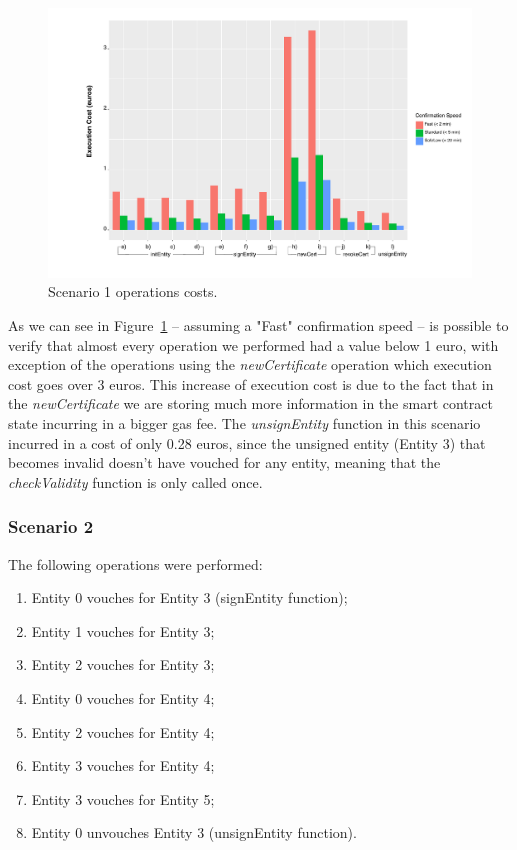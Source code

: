 \begin{figure}[htb]
  \centering
  \includegraphics[scale=0.5]{Figures/evaluation/wot-scenario1.pdf}
  \caption{Scenario 1 operations costs.}
\label{fig:scenario1-operation-cost}
\end{figure}

As we can see in Figure~\ref{fig:scenario1-operation-cost} – assuming a "Fast" confirmation speed – is possible to verify that almost every operation we performed had a value below 1 euro, with exception of the operations using the \textit{newCertificate} operation which execution cost goes over 3 euros.
This increase of execution cost is due to the fact that in the \textit{newCertificate} we are storing much more information in the smart contract state incurring in a bigger gas fee.
The \textit{unsignEntity} function in this scenario incurred in a cost of only 0.28 euros, since the unsigned entity (Entity 3) that becomes invalid doesn't have vouched for any entity, meaning that the \textit{checkValidity} function is only called once.

\subsubsection{Scenario 2}

The following operations were performed:

\begin{enumerate}[label=\alph*.]
  \item Entity 0 vouches for Entity 3 (signEntity function); %
  \item Entity 1 vouches for Entity 3; %
  \item Entity 2 vouches for Entity 3; %
  \item Entity 0 vouches for Entity 4; %
  \item Entity 2 vouches for Entity 4; %
  \item Entity 3 vouches for Entity 4; %
  \item Entity 3 vouches for Entity 5; %
  \item Entity 0 unvouches Entity 3 (unsignEntity function). %
\end{enumerate}

